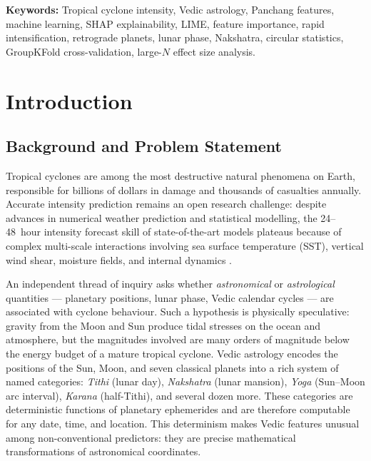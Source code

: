 \documentclass[12pt,a4paper]{article}
\begin{document}
\noindent\textbf{Keywords:} Tropical cyclone intensity, Vedic astrology, Panchang
features, machine learning, SHAP explainability, LIME, feature importance,
rapid intensification, retrograde planets, lunar phase, Nakshatra, circular
statistics, GroupKFold cross-validation, large-$N$ effect size analysis.

\medskip
\tableofcontents
\newpage

\section{Introduction}

\subsection{Background and Problem Statement}

Tropical cyclones are among the most destructive natural phenomena on Earth,
responsible for billions of dollars in damage and thousands of casualties
annually. Accurate intensity prediction remains an open research challenge:
despite advances in numerical weather prediction and statistical modelling,
the 24--48~hour intensity forecast skill of state-of-the-art models plateaus
because of complex multi-scale interactions involving sea surface temperature
(SST), vertical wind shear, moisture fields, and internal dynamics
\cite{demaria2014advances,zhang2018tropical}.

An independent thread of inquiry asks whether \emph{astronomical} or
\emph{astrological} quantities --- planetary positions, lunar phase, Vedic
calendar cycles --- are associated with cyclone behaviour. Such a hypothesis
is physically speculative: gravity from the Moon and Sun produce tidal stresses
on the ocean and atmosphere, but the magnitudes involved are many orders of
magnitude below the energy budget of a mature tropical cyclone.
Vedic astrology encodes the positions of the Sun, Moon, and seven classical
planets into a rich system of named categories: \textit{Tithi} (lunar day),
\textit{Nakshatra} (lunar mansion), \textit{Yoga} (Sun--Moon arc interval),
\textit{Karana} (half-Tithi), and several dozen more. These categories are
deterministic functions of planetary ephemerides and are therefore computable
for any date, time, and location. This determinism makes Vedic features unusual
among non-conventional predictors: they are precise mathematical transformations
of astronomical coordinates.
\end{document}
